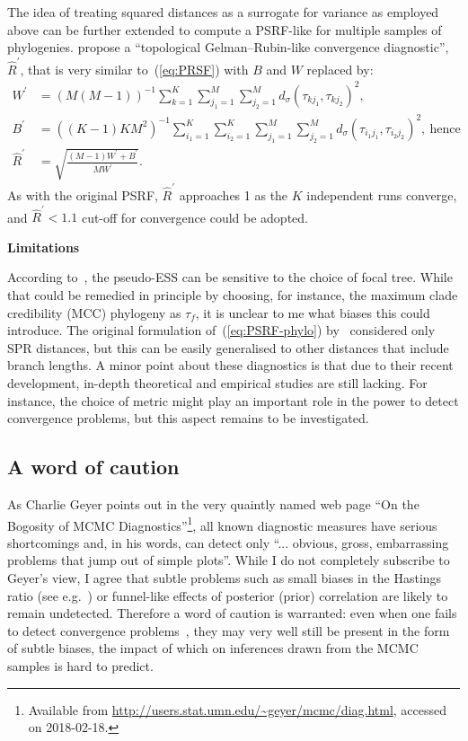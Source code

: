 The idea of treating squared distances as a surrogate for variance as employed above can be further extended to compute a PSRF-like for multiple samples of phylogenies.
\cite{Whidden2015} propose a ``topological Gelman--Rubin-like convergence diagnostic'', $\hat{R}^\prime$, that is very similar to~(\ref{eq:PRSF}) with $B$ and $W$ replaced by:
\begin{align}
 W^\prime &= \left(M(M-1)\right)^{-1}\sum_{k =1}^K\sum_{j_1 = 1}^M\sum_{j_2 = 1}^M d_\sigma(\tau_{kj_1}, \tau_{kj_2})^2,\\
 B^\prime &= \left((K-1)KM^2\right)^{-1} \sum_{i_1 = 1}^K\sum_{i_2 = 1}^K\sum_{j_1 = 1}^M \sum_{j_2 = 1}^M d_\sigma(\tau_{i_1j_1}, \tau_{i_2j_2})^2,\: \text{hence}\\
 \label{eq:PSRF-phylo}
 \hat{R}^\prime &= \sqrt{\frac{ (M-1)W^\prime +  B^\prime }{MW^\prime}}.
\end{align}
As with the original PSRF, $\hat{R}^\prime$ approaches 1 as the $K$ independent runs converge, and $\hat{R}^\prime < 1.1$ cut-off for convergence could be adopted.

\textbf{Limitations}

According to~\cite{Lanfear2016}, the pseudo-ESS can be sensitive to the choice of focal tree.
While that could be remedied in principle by choosing, for instance, the maximum clade credibility (MCC) phylogeny as $\tau_f$, it is unclear to me what biases this could introduce.
The original formulation of~(\ref{eq:PSRF-phylo}) by~\cite{Whidden2015} considered only SPR distances, but this can be easily generalised to other distances that include branch lengths.
A minor point about these diagnostics is that due to their recent development, in-depth theoretical and empirical studies are still lacking.
For instance, the choice of metric might play an important role in the power to detect convergence problems, but this aspect remains to be investigated.

\subsection{A word of caution}

As Charlie Geyer points out in the very quaintly named web page ``On the Bogosity of MCMC Diagnostics''\footnote{Available from \url{http://users.stat.umn.edu/~geyer/mcmc/diag.html}, accessed on 2018-02-18.}, all known diagnostic measures
have serious shortcomings and, in his words, can detect only ``... obvious, gross, embarrassing problems that jump out of simple plots''.
While I do not completely subscribe to Geyer's view,  I agree that subtle problems such as small biases in the Hastings ratio (see e.g.~\cite{Holder2005}) or funnel-like effects of posterior (prior) correlation are likely to remain undetected.
Therefore a word of caution is warranted: even when one fails to detect convergence problems~\citep{Cowles1999}, they may very well still be present in the form of subtle biases, the impact of which on inferences drawn from the MCMC samples is hard to predict.

